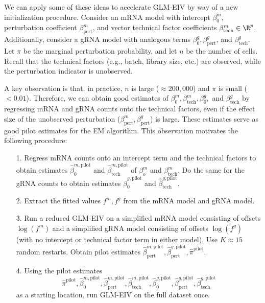 \documentclass[12pt]{article}
\begin{document}
 We can apply some of these ideas to accelerate GLM-EIV by way of a new initialization procedure. Consider an mRNA model with intercept $\beta^m_0$, perturbation coefficient $\beta^m_{\textrm{pert}}$, and vector technical factor coefficients $\beta^m_\textrm{tech} \in \R^p$. Additionally, consider a gRNA model with analogous terms $\beta^g_0, \beta^g_{\textrm{pert}}$, and $\beta^g_\textrm{tech}$. Let $\pi$ be the marginal perturbation probability, and let $n$ be the number of cells. Recall that the technical factors (e.g., batch, library size, etc.) are observed, while the perturbation indicator is unobserved.
 
A key observation is that, in practice, $n$ is large ($\approx 200,000$) and $\pi$ is small ($<0.01$). Therefore, we can obtain good estimates of $\beta_0^m, \beta^m_\textrm{tech}, \beta_0^g,$ and $\beta^g_\textrm{tech}$ by regressing mRNA and gRNA counts onto the technical factors, even if the effect size of the unobserved perturbation ($\beta^m_\textrm{pert}, \beta^g_{\textrm{pert}}$) is large. These estimates serve as good pilot estimates for the EM algorithm. This observation motivates the following procedure:
 
\begin{itemize}
\item[1.] Regress mRNA counts onto an intercept term and the technical factors to obtain estimates $\hat{\beta}_0^{m, \textrm{pilot}}$ and $\hat{\beta}_\textrm{tech}^{m,  \textrm{pilot}}$ of $\beta^m_o$ and $\beta^m_\textrm{tech}$. Do the same for the gRNA counts to obtain estimates $\hat{\beta}_0^{g, \textrm{pilot}}$ and $\hat{\beta}_\textrm{tech}^{g,  \textrm{pilot}}$.
\item[2.] Extract the fitted values $f^m, f^g$ from the mRNA model and gRNA model.
\item[3.] Run a reduced GLM-EIV on a simplified mRNA model consisting of offsets $\log(f^m)$ and a simplified gRNA model consisting of offsets $\log(f^g)$ (with no intercept or technical factor term in either model). Use $K \approx 15$ random restarts. Obtain pilot estimates $\hat{\beta}_{\textrm{pert}}^{m, \textrm{pilot}}, \hat{\beta}_{\textrm{pert}}^{g, \textrm{pilot}}, \hat{\pi}^{\textrm{pilot}}.$
\item[4.] Using the pilot estimates $$ \hat{\pi}^{\textrm{pilot}}, \hat{\beta}_0^{m, \textrm{pilot}}, \hat{\beta}_{\textrm{pert}}^{m, \textrm{pilot}}, \hat{\beta}_\textrm{tech}^{m,  \textrm{pilot}}, \hat{\beta}_0^{g, \textrm{pilot}}, \hat{\beta}_{\textrm{pert}}^{g, \textrm{pilot}},  \hat{\beta}_\textrm{tech}^{g,  \textrm{pilot}}$$ as a starting location, run GLM-EIV on the full dataset once.
\end{itemize} 
\end{document}
